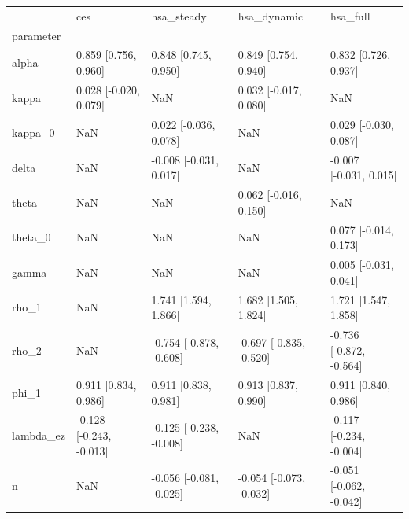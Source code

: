 \begin{tabular}{lllll}
\toprule
 & ces & hsa\_steady & hsa\_dynamic & hsa\_full \\
parameter &  &  &  &  \\
\midrule
alpha & 0.859 [0.756, 0.960] & 0.848 [0.745, 0.950] & 0.849 [0.754, 0.940] & 0.832 [0.726, 0.937] \\
kappa & 0.028 [-0.020, 0.079] & NaN & 0.032 [-0.017, 0.080] & NaN \\
kappa\_0 & NaN & 0.022 [-0.036, 0.078] & NaN & 0.029 [-0.030, 0.087] \\
delta & NaN & -0.008 [-0.031, 0.017] & NaN & -0.007 [-0.031, 0.015] \\
theta & NaN & NaN & 0.062 [-0.016, 0.150] & NaN \\
theta\_0 & NaN & NaN & NaN & 0.077 [-0.014, 0.173] \\
gamma & NaN & NaN & NaN & 0.005 [-0.031, 0.041] \\
rho\_1 & NaN & 1.741 [1.594, 1.866] & 1.682 [1.505, 1.824] & 1.721 [1.547, 1.858] \\
rho\_2 & NaN & -0.754 [-0.878, -0.608] & -0.697 [-0.835, -0.520] & -0.736 [-0.872, -0.564] \\
phi\_1 & 0.911 [0.834, 0.986] & 0.911 [0.838, 0.981] & 0.913 [0.837, 0.990] & 0.911 [0.840, 0.986] \\
lambda\_ez & -0.128 [-0.243, -0.013] & -0.125 [-0.238, -0.008] & NaN & -0.117 [-0.234, -0.004] \\
n & NaN & -0.056 [-0.081, -0.025] & -0.054 [-0.073, -0.032] & -0.051 [-0.062, -0.042] \\
\bottomrule
\end{tabular}
